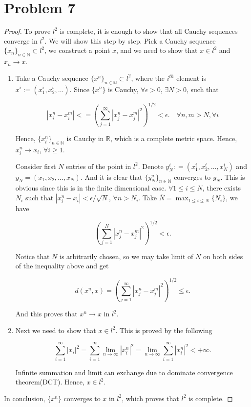 \documentclass[12pt]{article}
\begin{document}
\section*{Problem 7}

\begin{proof}

To prove $l^2$ is complete, it is enough to show that all Cauchy sequences converge in $l^2$. We will show this step by step. Pick a Cauchy sequence $\{x_n\}_{n\in\mathbb N}\subset l^2$, we construct a point $x$, and we need to show that $x\in l^2$ and $x_n\rightarrow x$.

\begin{enumerate}
\item

Take a Cauchy sequence $\{x^n\}_{n\in\mathbb N} \subset l^2$, where the $i^{th}$ element is $x^i := (x_1^i, x_2^i, \dots)$. Since $\{x^n\}$ is Cauchy, $\forall \epsilon > 0$, $\exists N > 0$, such that 

$$
|x_i^n - x_i^m| <= \left( \sum^{\infty}_{j=1} |x^n_j - x^m_j|^2\right)^{1/2} < \epsilon. \quad \forall n,m > N, \forall i
$$

Hence, $\{x_i^n\}_{n\in\mathbb N}$ is Cauchy in $\mathbb R$, which is a complete metric space. Hence, $x_i^n \rightarrow x_i$, $\forall i \geqslant 1$.

Consider first $N$ entries of the point in $l^2$. Denote $y^i_N : = (x_1^i, x_2^i, \dots, x_N^i)$ and $y_N = (x_1, x_2, \dots, x_N)$. And it is clear that $\{y^n_N\}_{n\in\mathbb N}$ converges to $y_N$. This is obvious since this is in the finite dimensional case. $\forall 1\leqslant i\leqslant N$, there exists $N_i$ such that $|x_i^n - x_i| < \epsilon / \sqrt{N}$, $\forall n > N_i$. Take $\overline N = \max_{1\leqslant i \leqslant N}\{N_i\}$, we have 

$$
\left( \sum^{N}_{j=1} |x^n_j - x^m_j|^2\right)^{1/2} < \epsilon.
$$

Notice that $N$ is arbitrarily chosen, so we may take limit of $N$ on both sides of the inequality above and get

$$
d(x^n, x) = \left( \sum^{\infty}_{j=1} |x^n_j - x^m_j|^2\right)^{1/2} \leqslant \epsilon.
$$

And this proves that $x^n\rightarrow x$ in $l^2$. 

\item

Next we need to show that $x \in l^2$. This is proved by the following

$$
\sum_{i = 1}^\infty |x_i|^2 = \sum_{i = 1}^\infty \lim_{n\rightarrow\infty}|x_i^n|^2 = \lim_{n\rightarrow\infty}\sum_{i = 1}^\infty |x_i^n|^2 < +\infty.
$$

Infinite summation and limit can exchange due to dominate convergence theorem(DCT). Hence, $x\in l^2$.

\end{enumerate}

In conclusion, $\{x^n\}$ converges to $x$ in $l^2$, which proves that $l^2$ is complete.

\end{proof}
\end{document}
